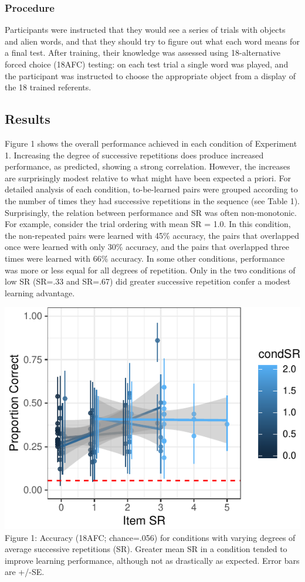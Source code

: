 \documentclass[man,floatsintext]{apa6}
\begin{document}
\hypertarget{procedure}{%
\subsubsection{Procedure}\label{procedure}}

Participants were instructed that they would see a series of trials with objects and alien words, and that they should try to figure out what each word means for a final test.
After training, their knowledge was assessed using 18-alternative forced choice (18AFC) testing: on each test trial a single word was played, and the participant was instructed to choose the appropriate object from a display of the 18 trained referents.

\hypertarget{results}{%
\subsection{Results}\label{results}}

Figure 1 shows the overall performance achieved in each condition of Experiment 1. Increasing the degree of successive repetitions does produce increased performance, as predicted, showing a strong correlation. However, the increases are surprisingly modest relative to what might have been expected a priori. For detailed analysis of each condition, to-be-learned pairs were grouped according to the number of times they had successive repetitions in the sequence (see Table 1). Surprisingly, the relation between performance and SR was often non-monotonic. For example, consider the trial ordering with mean SR = 1.0. In this condition, the non-repeated pairs were learned with 45\% accuracy, the pairs that overlapped once were learned with only 30\% accuracy, and the pairs that overlapped three times were learned with 66\% accuracy. In some other conditions, performance was more or less equal for all degrees of repetition. Only in the two conditions of low SR (SR=.33 and SR=.67) did greater successive repetition confer a modest learning advantage.

\includegraphics{figs/fig1-exp1-1.pdf}
Figure 1: Accuracy (18AFC; chance=.056) for conditions with varying degrees of average successive repetitions (SR). Greater mean SR in a condition tended to improve learning performance, although not as drastically as expected. Error bars are +/-SE.
\end{document}
